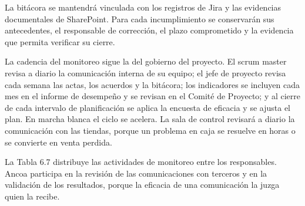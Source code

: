\documentclass[11pt]{article}
\begin{document}
La bitácora se mantendrá vinculada con los registros de Jira y las
evidencias documentales de SharePoint. Para cada incumplimiento se
conservarán sus antecedentes, el responsable de corrección, el plazo
comprometido y la evidencia que permita verificar su cierre.

La cadencia del monitoreo sigue la del gobierno del proyecto. El scrum
master revisa a diario la comunicación interna de su equipo; el jefe de
proyecto revisa cada semana las actas, los acuerdos y la bitácora; los
indicadores se incluyen cada mes en el informe de desempeño y se revisan
en el Comité de Proyecto; y al cierre de cada intervalo de planificación se aplica la
encuesta de eficacia y se ajusta el plan. En marcha blanca el ciclo se
acelera. La sala de control revisará a diario la comunicación con las
tiendas, porque un problema en caja se resuelve en horas o se convierte
en venta perdida.

La Tabla 6.7 distribuye las actividades de monitoreo entre los
responsables. Ancoa participa en la revisión de las comunicaciones con
terceros y en la validación de los resultados, porque la eficacia de una
comunicación la juzga quien la recibe.
\end{document}
